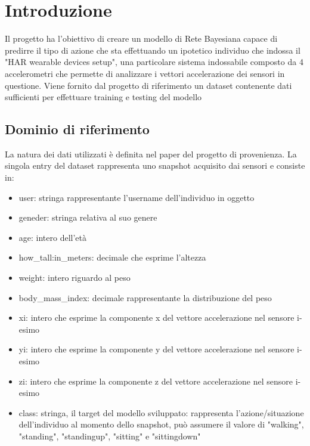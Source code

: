 \documentclass[12pt]{article}
\begin{document}

\tableofcontents
\pagebreak




\section{Introduzione}
Il progetto ha l'obiettivo di creare un modello di Rete Bayesiana capace di predirre il tipo di azione che sta effettuando un ipotetico individuo che indossa il "HAR wearable devices setup", una particolare sistema indossabile composto da 4 accelerometri che permette di analizzare i vettori accelerazione dei sensori in questione. Viene fornito dal progetto di riferimento\cite{HAR} un dataset contenente dati sufficienti per effettuare training e testing del modello

\subsection{Dominio di riferimento}
La natura dei dati utilizzati è definita nel paper\cite{Paper} del progetto di provenienza. La singola entry del dataset rappresenta uno snapshot acquisito dai sensori e consiste in:
\begin{itemize}
	\item user: stringa rappresentante l'username dell'individuo in oggetto
	\item geneder: stringa relativa al suo genere
	\item age: intero dell'età
	\item how\_tall:in\_meters: decimale che esprime l'altezza
	\item weight: intero riguardo al peso
	\item body\_mass\_index: decimale rappresentante la distribuzione del peso
	\item xi: intero che esprime la componente x del vettore accelerazione nel sensore i-esimo
	\item yi: intero che esprime la componente y del vettore accelerazione nel sensore i-esimo
	\item zi: intero che esprime la componente z del vettore accelerazione nel sensore i-esimo
	\item class: stringa, il target del modello sviluppato: rappresenta l'azione/situazione dell'individuo al momento dello snapshot, può assumere il valore di "walking", "standing", "standingup", "sitting" e "sittingdown"
\end{itemize}
\end{document}

